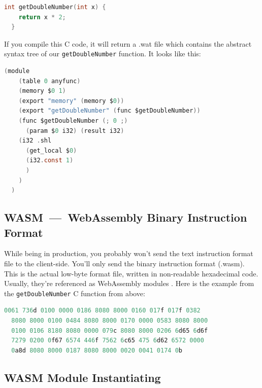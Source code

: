 \documentclass[10pt]{article}
\begin{document}
\begin{sloppypar}
  \vspace{7pt}
  \begin{lstlisting}[language=C, caption=Code example in C., label=lst:c-example]
  int getDoubleNumber(int x) {
    return x * 2;
  }\end{lstlisting}

  If you compile this C code, it will return a .wat file which contains the abstract syntax tree of our \lstinline{getDoubleNumber} function. It looks like this:

  \vspace{7pt}
  \begin{lstlisting}[language=C, caption=Code example from above compiled into the WebAssembly Text Format., label=lst:wat-example]
  (module
    (table 0 anyfunc)
    (memory $0 1)
    (export "memory" (memory $0))
    (export "getDoubleNumber" (func $getDoubleNumber))
    (func $getDoubleNumber (; 0 ;)
      (param $0 i32) (result i32)
    (i32 .shl
      (get_local $0)
      (i32.const 1)
      )
    )
  )\end{lstlisting}

  \subsection{WASM~—~WebAssembly Binary Instruction Format}
  \label{sec:webassembly-binary-instruction-format}

  While being in production, you probably won’t send the text instruction format file to the client-side. You’ll only send the binary instruction format (.wasm). This is the actual low-byte format file, written in non-readable hexadecimal code. Usually, they’re referenced as WebAssembly modules \citep{mozilla_webassembly_2023}. Here is the example from the \lstinline{getDoubleNumber} C function from above:

  \vspace{7pt}
  \begin{lstlisting}[language=C, caption=Code example from above compiled into the WebAssembly \\ Binary Instruction Format., label=lst:binary-example]
  0061 736d 0100 0000 0186 8080 8000 0160 017f 017f 0382
  8080 8000 0100 0484 8080 8000 0170 0000 0583 8080 8000
  0100 0106 8180 8080 0000 079c 8080 8000 0206 6d65 6d6f
  7279 0200 0f67 6574 446f 7562 6c65 475 6d62 6572 0000
  0a8d 8080 8000 0187 8080 8000 0020 0041 0174 0b\end{lstlisting}

  \subsection{WASM Module Instantiating}
  \label{sec:webassembly-module-instantiating}


\end{sloppypar}
\end{document}
